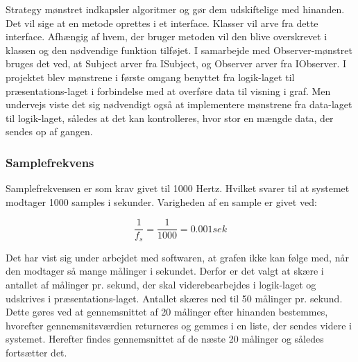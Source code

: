 Strategy mønstret indkapsler algoritmer og gør dem udskiftelige med hinanden. Det vil sige at en metode oprettes i et interface. Klasser vil arve fra dette interface. Afhængig af hvem, der bruger metoden vil den blive overskrevet i klassen og den nødvendige funktion tilføjet. I samarbejde med Observer-mønstret bruges det ved, at Subject arver fra ISubject, og Observer arver fra IObserver. 
I projektet blev mønstrene i første omgang benyttet fra logik-laget til præsentations-laget i forbindelse med at overføre data til visning i graf. Men undervejs viste det sig nødvendigt også at implementere mønstrene fra data-laget til logik-laget, således at det kan kontrolleres, hvor stor en mængde data, der sendes op af gangen. 

\subsubsection{Samplefrekvens}
Samplefrekvensen er som krav givet til 1000 Hertz. Hvilket svarer til at systemet modtager 1000 samples i sekunder. Varigheden af en sample er givet ved: 
\begin{ceqn}
\begin{equation}
\frac{1}{f_s}=\frac{1}{1000}=0.001 sek
\end{equation}
\end{ceqn}
Det har vist sig under arbejdet med softwaren, at grafen ikke kan følge med, når den modtager så mange målinger i sekundet. Derfor er det valgt at skære i antallet af målinger pr. sekund, der skal viderebearbejdes i logik-laget og udskrives i præsentations-laget. Antallet skæres ned til 50 målinger pr. sekund. Dette gøres ved at gennemsnittet af 20 målinger efter hinanden bestemmes, hvorefter gennemsnitsværdien returneres og gemmes i en liste, der sendes videre i systemet. Herefter findes gennemsnittet af de næste 20 målinger og således fortsætter det. 

